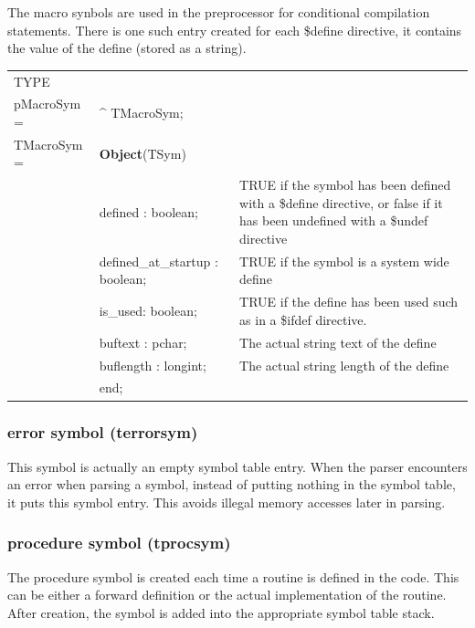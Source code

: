 \documentclass [12pt]{article}
\begin{document}
The macro synbols are used in the preprocessor for conditional compilation 
statements. There is one such entry created for each {\$}define directive, 
it contains the value of the define (stored as a string).

\begin{tabular*}{6.5in}{|l@{\extracolsep{\fill}}lp{6cm}|}
\hline
\textsf{TYPE}& & \\
\xspace pMacroSym = & \^{}  TMacroSym; & \\
\xspace \textsf{TMacroSym} = & \textbf{Object}(TSym) & \\
& \textsf{defined : boolean;}& 
	TRUE if the symbol has been defined with a \textsf{{\$}define}
	directive, or false if it has been undefined with a
	\textsf{{\$}undef} directive \\
& \textsf{defined{\_}at{\_}startup : boolean;}& 
	TRUE if the symbol is a system wide define \\
& \textsf{is{\_}used: boolean;}& 
	TRUE if the define has been used such as in a \textsf{{\$}ifdef}
	directive. \\
& \textsf{buftext : pchar;}& 
	The actual string text of the define \\
& \textsf{buflength : longint;}& 
	The actual string length of the define \\
& \textsf{end;}&  \\
\hline
\end{tabular*}

\subsubsection{error symbol (terrorsym)}
\label{subsubsec:error}

This symbol is actually an empty symbol table entry. When the parser 
encounters an error when parsing a symbol, instead of putting nothing in the 
symbol table, it puts this symbol entry. This avoids illegal memory accesses 
later in parsing.

\subsubsection{procedure symbol (tprocsym)}
\label{subsubsec:procedure}

The procedure symbol is created each time a routine is defined in the code. 
This can be either a forward definition or the actual implementation of the 
routine. After creation, the symbol is added into the appropriate symbol 
table stack.
\end{document}
